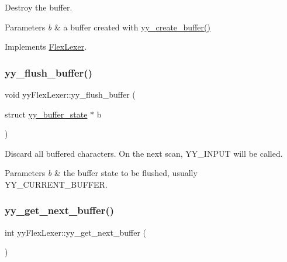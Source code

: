 Destroy the buffer. 
\begin{DoxyParams}{Parameters}
{\em b} & a buffer created with \hyperlink{classyyFlexLexer_ac72d57010353577c918e72eba3d8972a}{yy\+\_\+create\+\_\+buffer()} \\
\hline
\end{DoxyParams}


Implements \hyperlink{classFlexLexer_a6c59180ab84ba98af3704ba2cb018230}{Flex\+Lexer}.

\mbox{\label{classyyFlexLexer_ae2c2e8f3beb40d55311864d867493d68}} 
\subsubsection{\texorpdfstring{yy\+\_\+flush\+\_\+buffer()}{yy\_flush\_buffer()}}
{\footnotesize\ttfamily void yy\+Flex\+Lexer\+::yy\+\_\+flush\+\_\+buffer (\begin{DoxyParamCaption}\item[{struct \hyperlink{structyy__buffer__state}{yy\+\_\+buffer\+\_\+state} $\ast$}]{b }\end{DoxyParamCaption})\hspace{0.3cm}{\ttfamily [protected]}}

Discard all buffered characters. On the next scan, Y\+Y\+\_\+\+I\+N\+P\+UT will be called. 
\begin{DoxyParams}{Parameters}
{\em b} & the buffer state to be flushed, usually {\ttfamily Y\+Y\+\_\+\+C\+U\+R\+R\+E\+N\+T\+\_\+\+B\+U\+F\+F\+ER}. \\
\hline
\end{DoxyParams}
\mbox{\label{classyyFlexLexer_a3659121edfbb2d06999b22ca9255fb1a}} 
\subsubsection{\texorpdfstring{yy\+\_\+get\+\_\+next\+\_\+buffer()}{yy\_get\_next\_buffer()}}
{\footnotesize\ttfamily int yy\+Flex\+Lexer\+::yy\+\_\+get\+\_\+next\+\_\+buffer (\begin{DoxyParamCaption}{ }\end{DoxyParamCaption})\hspace{0.3cm}{\ttfamily [protected]}}

